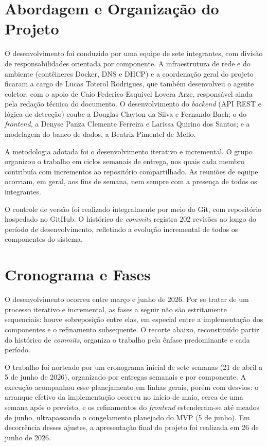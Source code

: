 \documentclass[
    12pt
    ,oneside
    ,a4paper
    ,chapter=TITLE
    ,section=TITLE
    ,sumario=abnt-6027-2012]{abntex2}
\begin{document}
\section{Abordagem e Organização do Projeto}

O desenvolvimento foi conduzido por uma equipe de sete integrantes, com divisão de responsabilidades orientada por componente. A infraestrutura de rede e do ambiente (contêineres Docker, DNS e DHCP) e a coordenação geral do projeto ficaram a cargo de Lucas Toterol Rodrigues, que também desenvolveu o agente coletor, com o apoio de Caio Federico Esquivel Lovera Arze, responsável ainda pela redação técnica do documento. O desenvolvimento do \textit{backend} (API REST e lógica de detecção) coube a Douglas Clayton da Silva e Fernando Bach; o do \textit{frontend}, a Denyse Panza Clemente Ferreira e Larissa Quirino dos Santos; e a modelagem do banco de dados, a Beatriz Pimentel de Mello.

A metodologia adotada foi o desenvolvimento iterativo e incremental. O grupo organizou o trabalho em ciclos semanais de entrega, nos quais cada membro contribuía com incrementos ao repositório compartilhado. As reuniões de equipe ocorriam, em geral, aos fins de semana, nem sempre com a presença de todos os integrantes.

O controle de versão foi realizado integralmente por meio do Git, com repositório hospedado no GitHub. O histórico de \textit{commits} registra 202 revisões ao longo do período de desenvolvimento, refletindo a evolução incremental de todos os componentes do sistema.

\section{Cronograma e Fases}
\label{sec:cronograma}

O desenvolvimento ocorreu entre março e junho de 2026. Por se tratar de um processo iterativo e incremental, as fases a seguir não são estritamente sequenciais: houve sobreposição entre elas, em especial entre a implementação dos componentes e o refinamento subsequente. O recorte abaixo, reconstituído  partir do histórico de \textit{commits}, organiza o trabalho pela ênfase predominante e cada período.

O trabalho foi norteado por um cronograma inicial de sete semanas (21 de abril a 5 de junho de 2026), organizado por entregas semanais e por componente. A execução acompanhou esse planejamento em linhas gerais, porém com desvios: o arranque efetivo da implementação ocorreu no início de maio, cerca de uma semana após o previsto, e os refinamentos do \textit{frontend} estenderam-se até meados de junho, ultrapassando o congelamento planejado do MVP (5 de junho). Em decorrência desses ajustes, a apresentação final do projeto foi realizada em 26 de junho de 2026.
\end{document}
